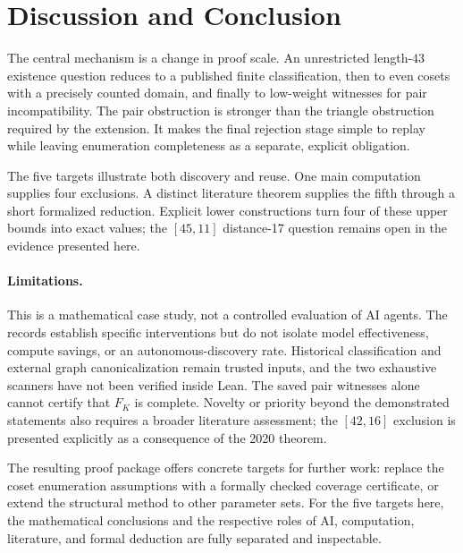 \section{Discussion and Conclusion}
The central mechanism is a change in proof scale. An unrestricted length-43 existence question reduces to a published finite classification, then to even cosets with a precisely counted domain, and finally to low-weight witnesses for pair incompatibility. The pair obstruction is stronger than the triangle obstruction required by the extension. It makes the final rejection stage simple to replay while leaving enumeration completeness as a separate, explicit obligation.

The five targets illustrate both discovery and reuse. One main computation supplies four exclusions. A distinct literature theorem supplies the fifth through a short formalized reduction. Explicit lower constructions turn four of these upper bounds into exact values; the $[45,11]$ distance-17 question remains open in the evidence presented here.

\paragraph{Limitations.}
This is a mathematical case study, not a controlled evaluation of AI agents. The records establish specific interventions but do not isolate model effectiveness, compute savings, or an autonomous-discovery rate. Historical classification and external graph canonicalization remain trusted inputs, and the two exhaustive scanners have not been verified inside Lean. The saved pair witnesses alone cannot certify that $F_K$ is complete. Novelty or priority beyond the demonstrated statements also requires a broader literature assessment; the $[42,16]$ exclusion is presented explicitly as a consequence of the 2020 theorem.

The resulting proof package offers concrete targets for further work: replace the coset enumeration assumptions with a formally checked coverage certificate, or extend the structural method to other parameter sets. For the five targets here, the mathematical conclusions and the respective roles of AI, computation, literature, and formal deduction are fully separated and inspectable.
